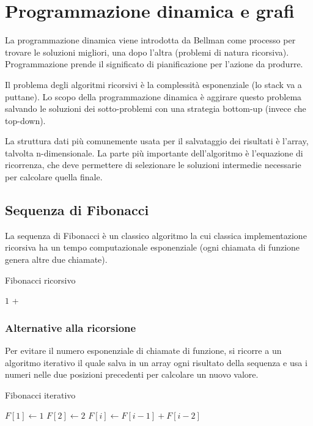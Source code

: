 \section{Programmazione dinamica e grafi}
La programmazione dinamica viene introdotta da Bellman come processo per trovare le soluzioni migliori, una dopo l'altra (problemi di natura ricorsiva). Programmazione prende il significato di pianificazione per l'azione da produrre. \par
Il problema degli algoritmi ricorsivi è la complessità esponenziale (lo stack va a puttane). Lo scopo della programmazione dinamica è aggirare questo problema salvando le soluzioni dei sotto-problemi con una strategia bottom-up (invece che top-down). \par
La struttura dati più comunemente usata per il salvataggio dei risultati è l'array, talvolta n-dimensionale. La parte più importante dell'algoritmo è l'equazione di ricorrenza, che deve permettere di selezionare le soluzioni intermedie necessarie per calcolare quella finale. 

\subsection{Sequenza di Fibonacci} 
La sequenza di Fibonacci è un classico algoritmo la cui classica implementazione ricorsiva ha un tempo computazionale esponenziale (ogni chiamata di funzione genera altre due chiamate).
\begin{algorithm}
	\caption{Fibonacci ricorsivo}
	\label{alg:fr}
	\begin{algorithmic}
			\State \Return $1$
		\Else
			\State \Return {} + 
		\EndIf
		\EndFunction
	\end{algorithmic}
\end{algorithm}

\subsubsection{Alternative alla ricorsione}
Per evitare il numero esponenziale di chiamate di funzione, si ricorre a un algoritmo iterativo il quale salva in un array ogni risultato della sequenza e usa i numeri nelle due posizioni precedenti per calcolare un nuovo valore.
\begin{algorithm}
	\caption{Fibonacci iterativo}
	\label{fi}
	\begin{algorithmic}
		\Function{fib\_it}{$n$}
		\State $F[1] \gets 1$
		\State $F[2] \gets 2$
		\For{$i \gets 3$ \textbf{to} $n$ \textbf{step} $1$}
		\State $F[i] \gets F[i - 1] + F[i - 2]$
		\EndFor
		\EndFunction
	\end{algorithmic}
\end{algorithm}

